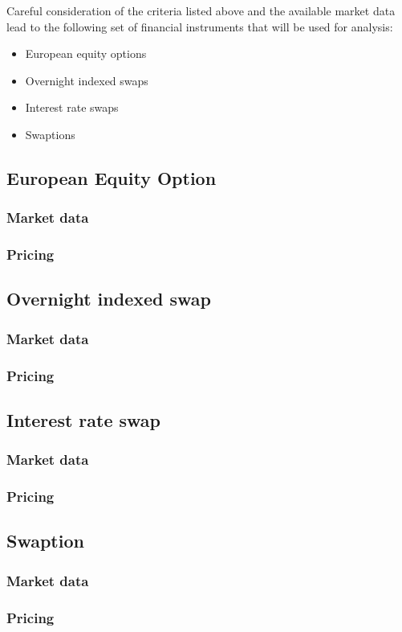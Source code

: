 \documentclass[../Thesis_AHoecherl.tex]{subfiles}
\begin{document}
    Careful consideration of the criteria listed above and the available market data lead to the following set of financial instruments that will be used for analysis:

    \begin{itemize}
        \item European equity options
        \item Overnight indexed swaps
        \item Interest rate swaps
        \item Swaptions
    \end{itemize}



    \subsection{European Equity Option}
    \subsubsection{Market data}
    \subsubsection{Pricing}
    \subsection{Overnight indexed swap}
    \subsubsection{Market data}
    \subsubsection{Pricing}
    \subsection{Interest rate swap}
    \subsubsection{Market data}
    \subsubsection{Pricing} 
    \subsection{Swaption}
    \subsubsection{Market data}
    \subsubsection{Pricing}
\end{document}

